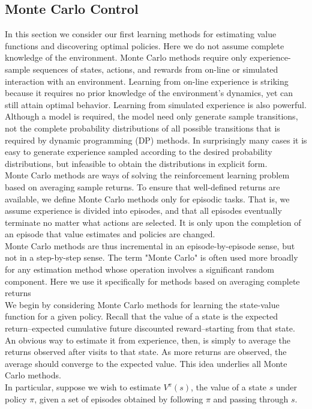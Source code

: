 \documentclass[11pt]{article}
\theoremstyle{plain}
\theoremstyle{definition}
\begin{document}
\subsection{Monte Carlo Control}
In this section we consider our first learning methods for estimating value functions and discovering optimal policies. Here we do not assume complete knowledge of the environment. Monte Carlo methods require only experience-sample sequences of states, actions, and rewards from on-line or simulated interaction with an environment. Learning from on-line experience is striking because it requires no prior knowledge of the environment's dynamics, yet can still attain optimal behavior. Learning from simulated experience is also powerful. Although a model is required, the model need only generate sample transitions, not the complete probability distributions of all possible transitions that is required by dynamic programming (DP) methods. In surprisingly many cases it is easy to generate experience sampled according to the desired probability distributions, but infeasible to obtain the distributions in explicit form.
\\
Monte Carlo methods are ways of solving the reinforcement learning problem based on averaging sample returns. To ensure that well-defined returns are available, we define Monte Carlo methods only for episodic tasks. That is, we assume experience is divided into episodes, and that all episodes eventually terminate no matter what actions are selected. It is only upon the completion of an episode that value estimates and policies are changed. 
\\
Monte Carlo methods are thus incremental in an episode-by-episode sense, but not in a step-by-step sense. The term "Monte Carlo" is often used more broadly for any estimation method whose operation involves a significant random component. Here we use it specifically for methods based on averaging complete returns
\\
We begin by considering Monte Carlo methods for learning the state-value function for a given policy. Recall that the value of a state is the expected return--expected cumulative future discounted reward--starting from that state. An obvious way to estimate it from experience, then, is simply to average the returns observed after visits to that state. As more returns are observed, the average should converge to the expected value. This idea underlies all Monte Carlo methods.
\\
In particular, suppose we wish to estimate $V^\pi(s)$, the value of a state $s$ under policy $\pi$, given a set of episodes obtained by following $\pi$  and passing through $s$.
\end{document}
